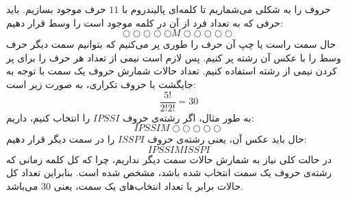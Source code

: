 \p
حروف را به شکلی می‌شماریم تا کلمه‌ای پالیندروم با
$11$
حرف موجود بسازیم. باید حرفی که به تعداد فرد از آن در کلمه موجود است را وسط قرار ‌دهیم:
$$ \bigcirc\bigcirc\bigcirc\bigcirc\bigcirc M \bigcirc\bigcirc\bigcirc\bigcirc\bigcirc $$
حال سمت راست یا چپ آن حرف را طوری پر می‌کنیم که بتوانیم سمت دیگر حرف وسط را با عکس آن رشته پر کنیم. پس لازم است نیمی از تعداد هر حرف را برای پر کردن نیمی از رشته استفاده کنیم. تعداد حالات شمارش حروف یک سمت با توجه به جایگشت با حروف تکراری، به صورت زیر است:
$$\frac{5!}{2!2!} = 30$$
به طور مثال، اگر رشته‌ی حروف
$IPSSI$
را انتخاب کنیم، داریم:
$$ IPSSIM\bigcirc\bigcirc\bigcirc\bigcirc\bigcirc $$
\p
حال باید عکس آن، یعنی رشته‌ی حروف
$ISSPI$
را در سمت دیگر قرار دهیم:
$$IPSSIMISSPI$$
در حالت کلی نیاز به شمارش حالات سمت دیگر نداریم، چرا که کل کلمه زمانی که رشته‌ی حروف یک سمت انتخاب شده باشد، مشخص شده است. بنابراین تعداد کل حالات برابر با تعداد انتخاب‌های یک سمت، یعنی
$30$
می‌باشد.